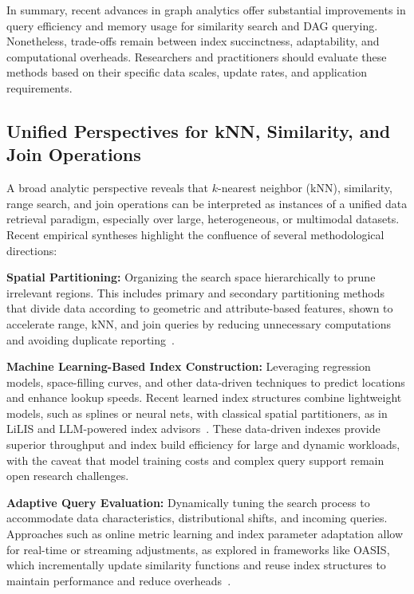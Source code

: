 \documentclass[sigconf]{acmart}
\begin{document}
In summary, recent advances in graph analytics offer substantial improvements in query efficiency and memory usage for similarity search and DAG querying. Nonetheless, trade-offs remain between index succinctness, adaptability, and computational overheads. Researchers and practitioners should evaluate these methods based on their specific data scales, update rates, and application requirements.

\subsection{Unified Perspectives for kNN, Similarity, and Join Operations}

A broad analytic perspective reveals that $k$-nearest neighbor (kNN), similarity, range search, and join operations can be interpreted as instances of a unified data retrieval paradigm, especially over large, heterogeneous, or multimodal datasets. Recent empirical syntheses highlight the confluence of several methodological directions:

\textbf{Spatial Partitioning:} Organizing the search space hierarchically to prune irrelevant regions. This includes primary and secondary partitioning methods that divide data according to geometric and attribute-based features, shown to accelerate range, kNN, and join queries by reducing unnecessary computations and avoiding duplicate reporting~\cite{ref114,ref51,ref50,ref56,ref86}.
 
\textbf{Machine Learning-Based Index Construction:} Leveraging regression models, space-filling curves, and other data-driven techniques to predict locations and enhance lookup speeds. Recent learned index structures combine lightweight models, such as splines or neural nets, with classical spatial partitioners, as in LiLIS and LLM-powered index advisors~\cite{ref34,ref54,ref111}. These data-driven indexes provide superior throughput and index build efficiency for large and dynamic workloads, with the caveat that model training costs and complex query support remain open research challenges.

\textbf{Adaptive Query Evaluation:} Dynamically tuning the search process to accommodate data characteristics, distributional shifts, and incoming queries. Approaches such as online metric learning and index parameter adaptation allow for real-time or streaming adjustments, as explored in frameworks like OASIS, which incrementally update similarity functions and reuse index structures to maintain performance and reduce overheads~\cite{ref39,ref47,ref91}.
\end{document}

